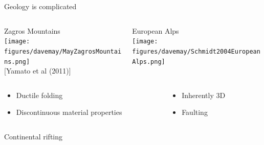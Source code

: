 \documentclass{beamer}
\begin{document}
\begin{frame}{Geology is complicated}
  \begin{columns}
    \begin{column}{0.65\textwidth}
      Zagros Mountains \\
      \texttt{[image: figures/davemay/MayZagrosMountains.png]} \\
      \vspace{-1ex} {\scriptsize [Yamato et al (2011)]}
    \end{column}
    \begin{column}{0.35\textwidth}
      European Alps \\
      \texttt{[image: figures/davemay/Schmidt2004EuropeanAlps.png]}
    \end{column}
  \end{columns}
  \begin{columns}
    \begin{column}{0.6\textwidth}
      \begin{itemize}
      \item Ductile folding
      \item Discontinuous material properties
      \end{itemize}
    \end{column}
    \begin{column}{0.4\textwidth}
      \begin{itemize}
      \item Inherently 3D
      \item Faulting
      \end{itemize}
    \end{column}
  \end{columns}
\end{frame}

\begin{frame}{Continental rifting}
\end{frame}
\end{document}
